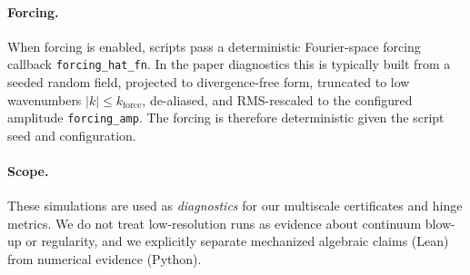 \documentclass[11pt]{article}
\begin{document}
\paragraph{Forcing.}
When forcing is enabled, scripts pass a deterministic Fourier-space forcing callback
\texttt{forcing\_hat\_fn}. In the paper diagnostics this is typically built from a seeded random field,
projected to divergence-free form, truncated to low wavenumbers \(|k|\le k_{\mathrm{force}}\),
de-aliased, and RMS-rescaled to the configured amplitude \texttt{forcing\_amp}. The forcing is
therefore deterministic given the script seed and configuration.

\paragraph{Scope.}
These simulations are used as \emph{diagnostics} for our multiscale certificates and hinge
metrics. We do not treat low-resolution runs as evidence about continuum blow-up or regularity,
and we explicitly separate mechanized algebraic claims (Lean) from numerical evidence (Python).
 


\end{document}
